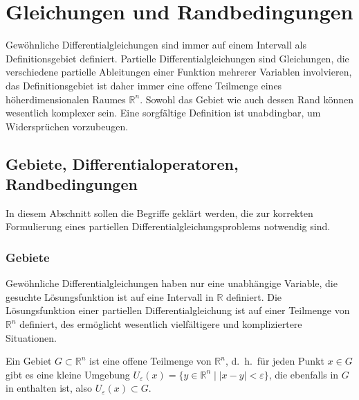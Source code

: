 %
%
%
\section{Gleichungen und Randbedingungen
\label{buch:pde:section:gleichungen-und-randbedingungen}}
Gewöhnliche Differentialgleichungen sind immer auf einem
Intervall als Definitionsgebiet definiert.
Partielle Differentialgleichungen sind Gleichungen, die verschiedene
partielle Ableitungen einer Funktion mehrerer Variablen involvieren,
das Definitionsgebiet ist daher immer eine offene Teilmenge 
eines höherdimensionalen Raumes $\mathbb{R}^n$.
Sowohl das Gebiet wie auch dessen Rand können wesentlich komplexer sein.
Eine sorgfältige Definition ist unabdingbar, um Widersprüchen vorzubeugen.

%
%
\subsection{Gebiete, Differentialoperatoren, Randbedingungen}
In diesem Abschnitt sollen die Begriffe geklärt werden, die zur
korrekten Formulierung eines partiellen Differentialgleichungsproblems
notwendig sind.

%
%
\subsubsection{Gebiete}
Gewöhnliche Differentialgleichungen haben nur eine unabhängige
Variable, die gesuchte Lösungsfunktion ist auf eine 
Intervall in $\mathbb{R}$ definiert.
Die Lösungsfunktion einer partiellen Differentialgleichung
ist auf einer Teilmenge von $\mathbb{R}^n$ definiert, des 
ermöglicht wesentlich vielfältigere und kompliziertere
Situationen.

\begin{definition}
\label{buch:pde:definition:gebiet}
Ein Gebiet $G\subset\mathbb{R}^n$ ist eine offene Teilmenge
von $\mathbb{R}^n$, d.~h.~für jeden Punkt $x\in G$ gibt es
eine kleine Umgebung
\(
U_{\varepsilon}(x)
=
\{y\in\mathbb{R}^n\mid |x-y|<\varepsilon\}
\), die ebenfalls in $G$ in enthalten ist,
also $U_{\varepsilon}(x)\subset G$.
%
\end{definition}

%
%
